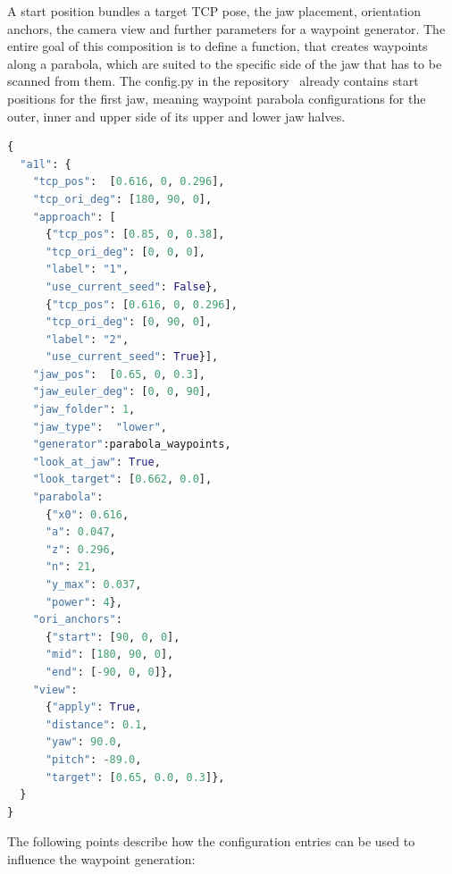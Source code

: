 A start position bundles a target TCP pose, the jaw placement, orientation anchors, the camera view and further parameters for a waypoint generator. The entire goal of this composition is to define a function, that creates waypoints along a parabola, which are suited to the specific side of the jaw that has to be scanned from them. The config.py in the repository~\cite{ur5e_bullet_repository} already contains start positions for the first jaw, meaning waypoint parabola configurations for the outer, inner and upper side of its upper and lower jaw halves.
\begin{lstlisting}[caption={start position example}, label={lst:ms-start_pos_example}, language=Python]
{
  "a1l": {
    "tcp_pos":  [0.616, 0, 0.296],
    "tcp_ori_deg": [180, 90, 0],
    "approach": [
      {"tcp_pos": [0.85, 0, 0.38],
      "tcp_ori_deg": [0, 0, 0],
      "label": "1",
      "use_current_seed": False},
      {"tcp_pos": [0.616, 0, 0.296],
      "tcp_ori_deg": [0, 90, 0],
      "label": "2",
      "use_current_seed": True}],
    "jaw_pos":  [0.65, 0, 0.3],
    "jaw_euler_deg": [0, 0, 90],
    "jaw_folder": 1,
    "jaw_type":  "lower",
    "generator":parabola_waypoints,
    "look_at_jaw": True,
    "look_target": [0.662, 0.0],
    "parabola":
      {"x0": 0.616,
      "a": 0.047,
      "z": 0.296,
      "n": 21,
      "y_max": 0.037,
      "power": 4},
    "ori_anchors":
      {"start": [90, 0, 0],
      "mid": [180, 90, 0],
      "end": [-90, 0, 0]},
    "view":
      {"apply": True,
      "distance": 0.1,
      "yaw": 90.0,
      "pitch": -89.0,
      "target": [0.65, 0.0, 0.3]},
  }
}
\end{lstlisting}
The following points describe how the configuration entries can be used to influence the waypoint generation:

